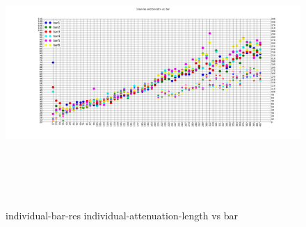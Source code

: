 \documentclass[12pt]{article}
\begin{document}
\begin{figure}[ht]
	\includegraphics[height=4in,width=6in]{att-length-2.pdf}
	\caption{individual-bar-res individual-attenuation-length vs bar}
	\label{fig8}
\end{figure}













\label{bib}


\end{document}
